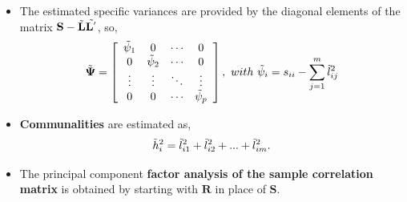 \documentclass[10pt]{beamer} %
\begin{document}
\begin{frame}
   \begin{itemize}
      \item The estimated specific variances are provided by the diagonal elements of the matrix $\mathbf{S}-\Tilde{\mathbf{L}}\Tilde{\mathbf{L}^{'}}$, so,
         \begin{equation*}
            \Tilde{\mathbf{\Psi}}=\left[
               \begin{array}{cccc}
                  \Tilde{\psi}_1 & 0 & \cdots & 0 \\
                  0 & \Tilde{\psi}_2 & \cdots & 0 \\
                  \vdots & \vdots & \ddots & \vdots \\
                  0 & 0 & \cdots & \Tilde{\psi}_p
               \end{array}
            \right],\ with\ \Tilde{\psi}_i=s_{ii}-\sum_{j=1}^m \Tilde{l}_{ij}^2
         \end{equation*}
      \item \textbf{Communalities} are estimated as,
         \begin{equation*}
            \Tilde{h}_i^2 = \Tilde{l}_{i1}^2+\Tilde{l}_{i2}^2+...+\Tilde{l}_{im}^2.
         \end{equation*}
      \item The principal component \textbf{factor analysis of the sample correlation matrix} is obtained by starting with $\mathbf{R}$ in place of $\mathbf{S}$.
   \end{itemize}
\end{frame}
\end{document}

